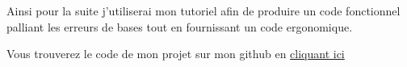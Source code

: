 \documentclass[12pt]{article}
\begin{document}
Ainsi pour la suite j’utiliserai mon tutoriel afin de produire un code fonctionnel palliant les erreurs de bases tout en fournissant un code ergonomique.\par

Vous trouverez le code de mon projet sur mon github en \href{https://github.com/LyndaOudjedi/TDD}{cliquant ici}\par


\vspace{\baselineskip}
\setlength{\parskip}{0.0pt}

\vspace{\baselineskip}
\setlength{\parskip}{8.04pt}

\vspace{\baselineskip}

\printbibliography
\end{document}
